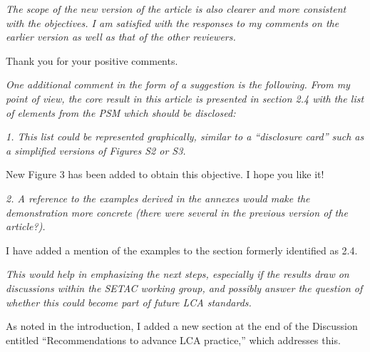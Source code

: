 \documentclass[11pt,letterpaper]{article}
\begin{document}
\emph{The scope of the new version of the article is also clearer and more consistent with the
objectives. I am satisfied with the responses to my comments on the earlier version as well as
that of the other reviewers.}

Thank you for your positive comments.

\emph{One additional comment in the form of a suggestion is the following. From my point of view, the
core result in this article is presented in section 2.4 with the list of elements from the PSM which
should be disclosed:}

\emph{1. This list could be represented graphically, similar to a “disclosure card” such as a
  simplified versions of Figures S2 or S3.}

New Figure 3 has been added to obtain this objective.  I hope you like it!

\emph{2. A reference to the examples derived in the annexes would make the demonstration
  more concrete (there were several in the previous version of the article?).}

I have added a mention of the examples to the section formerly identified as 2.4.

\emph{This would help in emphasizing the next steps, especially if the results draw on discussions
within the SETAC working group, and possibly answer the question of whether this could
become part of future LCA standards.}

As noted in the introduction, I added a new section at the end of the Discussion entitled ``Recommendations to advance LCA practice,'' which addresses this.
\end{document}
